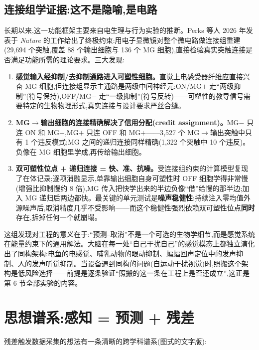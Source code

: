 \documentclass[UTF8,12pt,a4paper]{ctexart}
\begin{document}
\subsection{连接组学证据:这不是隐喻,是电路}

长期以来,这一功能框架主要来自电生理与行为实验的推断。Perks 等人 2026 年发表于 \emph{Nature} 的工作\cite{perks2026}给出了终极约束:用电子显微镜对整个微电路做连接组重建(29{,}694 个突触,覆盖 88 个输出细胞与 136 个 MG 细胞),直接检验真实突触连接是否满足功能所需的理论要求。三大发现:

\begin{enumerate}
  \item \textbf{感觉输入经抑制/去抑制通路进入可塑性细胞。}直觉上电感受器纤维应直接兴奋 MG 细胞,但连接组显示主通路是两级中间神经元:ON/MG$+$ 走``两级抑制''(符号保持),OFF/MG$-$ 走``一级抑制''(符号反转)——可塑性的教导信号需要特定的生物物理形式,真实连接与设计要求严丝合缝。
  \item \textbf{MG$\to$输出细胞的连接精确解决了信用分配(credit assignment)。}MG$-$ 只连 ON 和 MG$+$,MG$+$ 只连 OFF 和 MG$+$——3{,}527 个 MG$\to$输出突触中只有 1 个违反模式;MG 之间的递归连接同样精确(1{,}322 个突触中 10 个违反)。负像在 MG 细胞里学成,再传给输出细胞。
  \item \textbf{双可塑性位点 + 递归连接 = 快、准、抗噪。}受连接组约束的计算模型复现了在体记录;逐项消融显示,单靠输出细胞自身可塑性时 OFF 细胞学得非常慢(增强比抑制慢约 8 倍),MG 传入把快学出来的半边负像``借''给慢的那半边;加入 MG 递归后两边都快。最关键的单元测试是\textbf{噪声稳健性}:持续注入零均值外源噪声后,取消精度几乎不受影响——而这个稳健性强烈依赖双可塑性位点\textbf{同时}存在,拆掉任何一个就崩塌。
\end{enumerate}

这组发现对工程的意义在于:``预测--取消''不是一个可选的生物学细节,而是感觉系统在能量约束下的通用解法。大脑在每一处``自己干扰自己''的感觉模态上都独立演化出了同构架构:电鱼的电感觉、哺乳动物的眼动抑制、蝙蝠回声定位中的发声抑制、人的发声听觉抑制。当设备遇到同构的问题(自运动干扰视觉)时,照搬这个架构是低风险选择——前提是逐条验证``照搬的这一条在工程上是否还成立'',这正是第 6 节全部实验的内容。

\section{思想谱系:感知 = 预测 + 残差}

残差触发数据采集的想法有一条清晰的跨学科谱系(图式的文字版):
\end{document}

